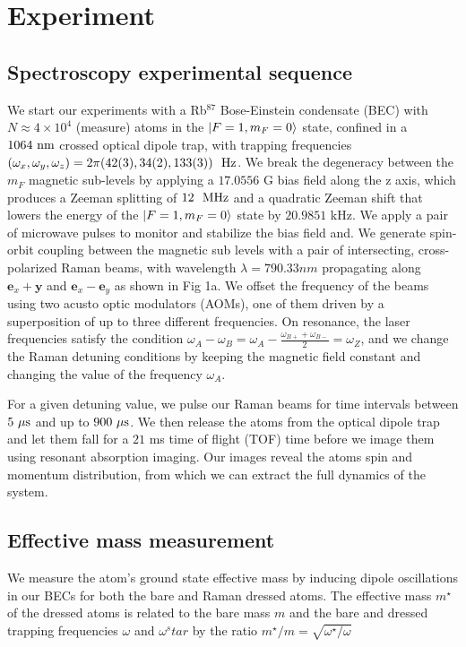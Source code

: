 \section{Experiment}

 

\subsection{Spectroscopy experimental sequence}


We start our experiments with a Rb$^{87}$ Bose-Einstein condensate (BEC) with $N\approx 4\times 10^4$ (measure) atoms in the $|F=1,m_F=0\rangle$ state, confined in a $1064{\ {\rm nm}}$ crossed optical dipole trap, with trapping frequencies $(\omega_x,\omega_y,\omega_z)=2\pi(42(3),34(2),133(3))\ \Hz$. We break the degeneracy between the $m_F$ magnetic sub-levels by applying a $17.0556$ G bias field along the z axis, which produces a Zeeman splitting of $12 \ {\ {\rm MHz}}$ and a quadratic Zeeman shift that lowers the energy of the $|F=1,m_F=0\rangle$ state  by $20.9851$ kHz. 
We apply a pair of microwave pulses to monitor and stabilize the bias field and. We generate spin-orbit coupling between the magnetic sub levels with a pair of intersecting, cross-polarized Raman beams, with wavelength $\lambda=790.33 nm$ propagating along $\mathbf{e}_x+\mathbf{y}$ and $\mathbf{e}_x-\mathbf{e}_y$ as shown in Fig 1a. We offset the frequency of the beams using two acusto optic modulators (AOMs), one of them driven by a superposition of up to three different frequencies. On resonance, the laser frequencies satisfy the condition $\omega_A-\omega_B=\omega_A-\frac{\omega_{B+}+\omega_{B-}}{2}=\omega_Z$, and we change the Raman detuning conditions by keeping the magnetic field constant and changing the value of the frequency $\omega_A$.

For a given detuning value, we pulse our Raman beams for time intervals between $5{\ \mu{\rm s}}$ and up to $900{\ \mu{\rm s}}$. We then release the atoms from the optical dipole trap and let them fall for a $21$ ms time of flight (TOF) time before we image them using resonant absorption imaging. Our images 
reveal the atoms spin and momentum distribution, from which we can extract the full dynamics of the system. 


\subsection{Effective mass measurement}

We measure the atom's ground state effective mass by inducing dipole oscillations in our BECs for both the bare and Raman dressed atoms. The effective mass $m^{\star}$ of the dressed atoms is related to the bare mass $m$ and the bare and dressed trapping frequencies $\omega$ and $\omega{^star}$ by the ratio $m^{\star}/m=\sqrt{\omega^{\star}/\omega}$

